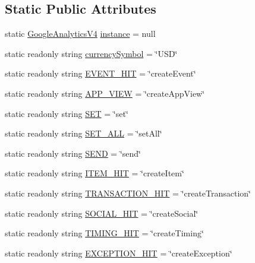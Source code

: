 \subsection*{Static Public Attributes}
\begin{DoxyCompactItemize}
\item 
static \hyperlink{class_google_analytics_v4}{Google\+Analytics\+V4} \hyperlink{class_google_analytics_v4_afc8e694a1f868f6382de7a436c18f177}{instance} = null
\item 
static readonly string \hyperlink{class_google_analytics_v4_aa3bd9e3c4319d360ec963529d43b7ec4}{currency\+Symbol} = \char`\"{}U\+SD\char`\"{}
\item 
static readonly string \hyperlink{class_google_analytics_v4_a3d3a83d85fdb71580903e04ce7030ad4}{E\+V\+E\+N\+T\+\_\+\+H\+IT} = \char`\"{}create\+Event\char`\"{}
\item 
static readonly string \hyperlink{class_google_analytics_v4_a3ddc4abb51a8d85898933ee3b23e40ab}{A\+P\+P\+\_\+\+V\+I\+EW} = \char`\"{}create\+App\+View\char`\"{}
\item 
static readonly string \hyperlink{class_google_analytics_v4_a67560f10be0e96061be07c79a156060c}{S\+ET} = \char`\"{}set\char`\"{}
\item 
static readonly string \hyperlink{class_google_analytics_v4_a9b16ac4148a6ca3a423cfa5fbf718361}{S\+E\+T\+\_\+\+A\+LL} = \char`\"{}set\+All\char`\"{}
\item 
static readonly string \hyperlink{class_google_analytics_v4_a81d1d9fb0402066d7326c3544535f485}{S\+E\+ND} = \char`\"{}send\char`\"{}
\item 
static readonly string \hyperlink{class_google_analytics_v4_afbd96028d516bca1f51bd6e01ecfaf65}{I\+T\+E\+M\+\_\+\+H\+IT} = \char`\"{}create\+Item\char`\"{}
\item 
static readonly string \hyperlink{class_google_analytics_v4_ab312e2bcacd9cff411ecb601d2ed4e3c}{T\+R\+A\+N\+S\+A\+C\+T\+I\+O\+N\+\_\+\+H\+IT} = \char`\"{}create\+Transaction\char`\"{}
\item 
static readonly string \hyperlink{class_google_analytics_v4_acd629a2b4e1ed6eaa6ed196b92578d6d}{S\+O\+C\+I\+A\+L\+\_\+\+H\+IT} = \char`\"{}create\+Social\char`\"{}
\item 
static readonly string \hyperlink{class_google_analytics_v4_ab5c1de675a8c8348cc0aaa88d2f40926}{T\+I\+M\+I\+N\+G\+\_\+\+H\+IT} = \char`\"{}create\+Timing\char`\"{}
\item 
static readonly string \hyperlink{class_google_analytics_v4_a436b84e72a3431b0147f409cb1e13e6f}{E\+X\+C\+E\+P\+T\+I\+O\+N\+\_\+\+H\+IT} = \char`\"{}create\+Exception\char`\"{}
\end{DoxyCompactItemize}


